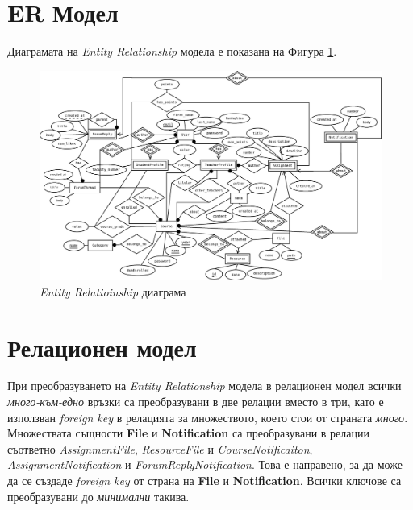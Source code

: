 \documentclass[a4paper,10pt, leqno]{article}
\newcommand{\enti}[1] {\textbf{#1}}
\newcommand{\la}[1] {\textsl{#1}}
\newcommand{\rela}[1] {\textsl{#1}}
\newcommand{\figref}[1] {Фигура \ref{#1}}
\begin{document}
      \section{ER Модел}
      Диаграмата на \la{Entity Relationship} модела е показана на \figref{fig:er}.
      \begin{figure}
	\label{fig:er}
      	\caption{\la{Entity Relatioinship} диаграма}
	 \centering
	 \includegraphics[width=21cm, angle=90]{../entity_relationship.jpeg}
      \end{figure}

      \section{Релационен модел}
      При преобразуването на \la{Entity Relationship} модела в релационен модел всички \la{много-към-едно} връзки са преобразувани
      в две релации вместо в три, като е използван \la{foreign key} в релацията за множеството, което стои от страната \la{много}.
      Множествата същности \enti{File} и \enti{Notification} са преобразувани в релации съответно \rela{AssignmentFile}, \rela{ResourceFile}
      и \rela{CourseNotificaiton}, \rela{AssignmentNotification} и \rela{ForumReplyNotification}. Това е направено, за да може да се
      създаде \la{foreign key} от страна на \enti{File} и \enti{Notification}.
      Всички ключове са преобразувани до \emph{минимални} такива.
\end{document}
